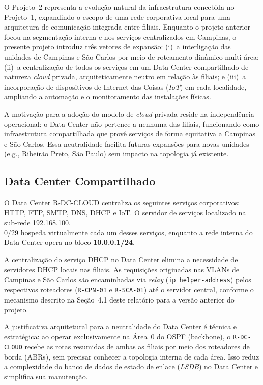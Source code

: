 \documentclass[12pt,a4paper]{article}
\begin{document}
O Projeto~2 representa a evolução natural da infraestrutura concebida no Projeto~1,
expandindo o escopo de uma rede corporativa local para uma arquitetura de comunicação
integrada entre filiais. Enquanto o projeto anterior focou na segmentação interna e
nos serviços centralizados em Campinas, o presente projeto introduz três vetores de
expansão: (i)~a interligação das unidades de Campinas e São Carlos por meio de
roteamento dinâmico multi-área; (ii)~a centralização de todos os serviços em um
Data Center compartilhado de natureza \textit{cloud} privada, arquiteticamente
neutro em relação às filiais; e (iii)~a incorporação de dispositivos de Internet das
Coisas (\textit{IoT}) em cada localidade, ampliando a automação e o monitoramento
das instalações físicas.

A motivação para a adoção do modelo de \textit{cloud} privada reside na
independência operacional: o Data Center não pertence a nenhuma das filiais,
funcionando como infraestrutura compartilhada que provê serviços de forma
equitativa a Campinas e São Carlos. Essa neutralidade facilita futuras expansões
para novas unidades (e.g., Ribeirão Preto, São Paulo) sem impacto na topologia já
existente.

\subsection{Data Center Compartilhado}

O Data Center R-DC-CLOUD centraliza os seguintes serviços corporativos:
HTTP, FTP, SMTP, DNS, DHCP e IoT. O servidor de serviços localizado na sub-rede
    192.168.100.\\0/29 hospeda virtualmente cada um desses serviços, enquanto a
rede interna do Data Center opera no bloco \textbf{10.0.0.1/24}.

A centralização do serviço DHCP no Data Center elimina a necessidade de servidores
DHCP locais nas filiais. As requisições originadas nas VLANs de Campinas e São
Carlos são encaminhadas via \textit{relay} (\texttt{ip helper-address}) pelos
respectivos roteadores (\texttt{R-CPN-01} e \texttt{R-SCA-01}) até o servidor
central, conforme o mecanismo descrito na Seção~4.1 deste relatório para a versão
anterior do projeto.

A justificativa arquitetural para a neutralidade do Data Center é técnica e
estratégica: ao operar exclusivamente na Área~0 do OSPF (backbone), o
\texttt{R-DC-CLOUD} recebe as rotas resumidas de ambas as filiais por meio dos
roteadores de borda (ABRs), sem precisar conhecer a topologia interna de cada área.
Isso reduz a complexidade do banco de dados de estado de enlace (\textit{LSDB}) no
Data Center e simplifica sua manutenção.
\end{document}
